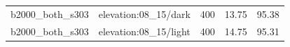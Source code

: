 \begin{longtable}{l>{\raggedright\arraybackslash}p{.42\linewidth}rrr}
b2000\_\allowbreak{}both\_\allowbreak{}s303 & %
elevation:08\_\allowbreak{}15/dark & %
400 & %
13.75 & %
95.38 \\ %

b2000\_\allowbreak{}both\_\allowbreak{}s303 & %
elevation:08\_\allowbreak{}15/light & %
400 & %
14.75 & %
95.31 \\ %


\end{longtable}
